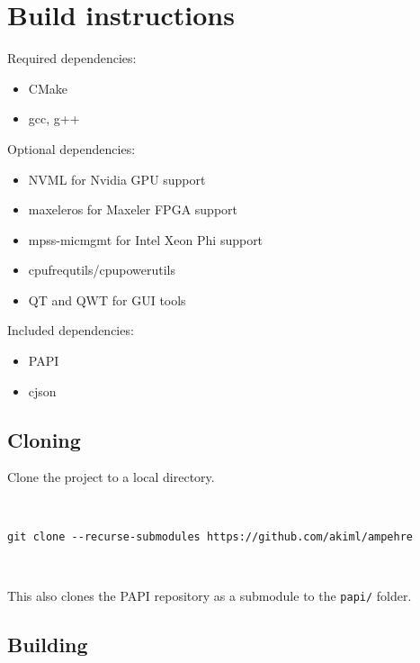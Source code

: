%
%
%
%
%
%

\section{Build instructions}

Required dependencies:
\begin{itemize}
    \item CMake
    \item gcc, g++
\end{itemize}

\noindent Optional dependencies:
\begin{itemize}
    \item NVML for Nvidia GPU support
    \item maxeleros for Maxeler FPGA support
    \item mpss-micmgmt for Intel Xeon Phi support
    \item cpufrequtils/cpupowerutils
    \item QT and QWT for GUI tools
\end{itemize}

\noindent Included dependencies:
\begin{itemize}
    \item PAPI
    \item cjson
\end{itemize}

\subsection{Cloning}

Clone the project to a local directory.

~

\verb+git clone --recurse-submodules https://github.com/akiml/ampehre+

~

\noindent This also clones the PAPI repository as a submodule to the \verb+papi/+ folder.

\subsection{Building}


